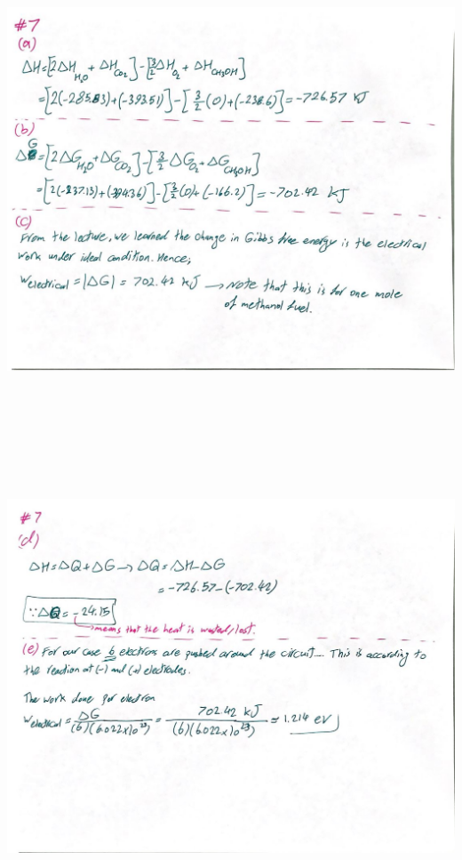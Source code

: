 \documentclass[fleqn]{article}
\begin{document}
\begin{enumerate}
    \begin{center}
      \includegraphics[height=14cm, width=16cm]{7A.JPG}
    \end{center}

    \pagebreak

    \begin{center}
      \includegraphics[height=14cm, width=16cm]{7B.JPG}
    \end{center}


\end{enumerate}
\end{document}
